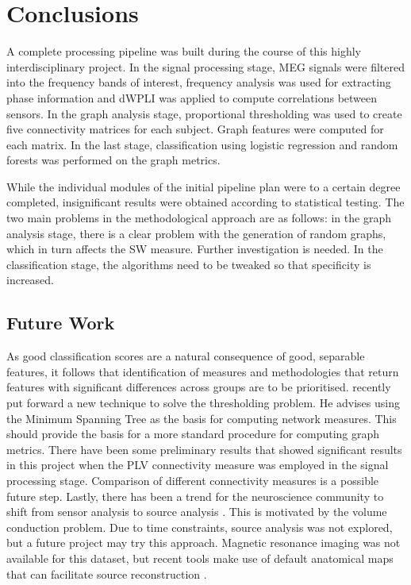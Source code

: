 

\chapter{Conclusions}
	A complete processing pipeline was built during the course of this highly interdisciplinary project. In the signal processing stage, \ac{MEG} signals were filtered into the frequency bands of interest, frequency analysis was used for extracting phase information and \ac{dWPLI} was applied to compute correlations between sensors. In the graph analysis stage, proportional thresholding was used to create five connectivity matrices for each subject. Graph features were computed for each matrix. In the last stage, classification using logistic regression and random forests was performed on the graph metrics.

	While the individual modules of the initial pipeline plan were to a certain degree completed, insignificant results were obtained according to statistical testing. The two main problems in the methodological approach are as follows: in the graph analysis stage, there is a clear problem with the generation of random graphs, which in turn affects the \ac{SW} measure. Further investigation is needed. In the classification stage, the algorithms need to be tweaked so that specificity is increased.
	
	\section{Future Work}

	As good classification scores are a natural consequence of good, separable features, it follows that identification of measures and methodologies that return features with significant differences across groups are to be prioritised. \textcite{Stam2014} recently put forward a new technique to solve the thresholding problem. He advises using the Minimum Spanning Tree as the basis for computing network measures. This should provide the basis for a more standard procedure for computing graph metrics.
	There have been some preliminary results that showed significant results in this project when the \ac{PLV} connectivity measure was employed in the signal processing stage. Comparison of different connectivity measures is a possible future step.
	Lastly, there has been a trend for the neuroscience community to shift from sensor analysis to source analysis \autocite{Schoffelen2009}. This is motivated by the volume conduction problem. Due to time constraints, source analysis was not explored, but a future project may try this approach. Magnetic resonance imaging was not available for this dataset, but recent tools make use of default anatomical maps that can facilitate source reconstruction \autocite{Tadel2011}.
	

